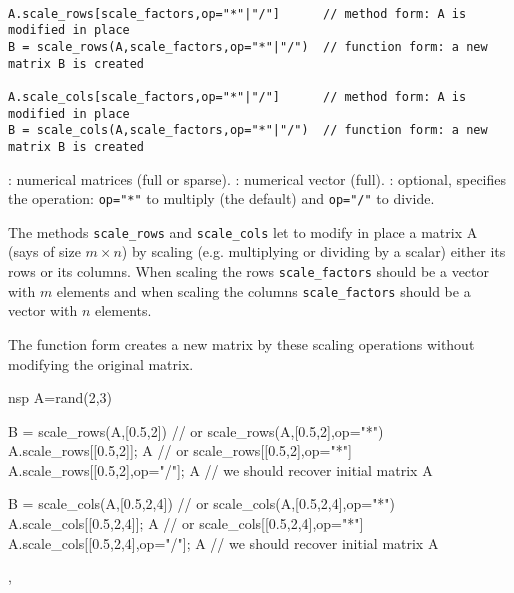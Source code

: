 \begin{mandesc}
  \\ 
\end{mandesc}
\begin{calling_sequence}
\begin{verbatim}
A.scale_rows[scale_factors,op="*"|"/"]      // method form: A is modified in place
B = scale_rows(A,scale_factors,op="*"|"/")  // function form: a new matrix B is created

A.scale_cols[scale_factors,op="*"|"/"]      // method form: A is modified in place
B = scale_cols(A,scale_factors,op="*"|"/")  // function form: a new matrix B is created
\end{verbatim}
\end{calling_sequence}
\begin{parameters}
  \begin{varlist}
    : numerical matrices (full or sparse).
    : numerical vector (full).
    : optional, specifies the operation: \verb+op="*"+ to multiply (the default)
                   and  \verb+op="/"+ to divide.
  \end{varlist}
\end{parameters}

\begin{mandescription}

The methods \verb+scale_rows+ and \verb+scale_cols+ let to modify in place a matrix A 
(says of size $m \times n$) by scaling (e.g. multiplying or dividing by a scalar) either its rows 
or its columns. When scaling the rows  \verb+scale_factors+ should be a vector with $m$ 
elements and when scaling the columns \verb+scale_factors+ should be a vector with 
$n$ elements.

The function form  creates a new matrix by these scaling operations without modifying 
the original matrix.
\end{mandescription}


\begin{examples}
\begin{mintednsp}{nsp}
A=rand(2,3)

B = scale_rows(A,[0.5,2])    // or scale_rows(A,[0.5,2],op="*") 
A.scale_rows[[0.5,2]]; A     // or scale_rows[[0.5,2],op="*"] 
A.scale_rows[[0.5,2],op="/"]; A  // we should recover initial matrix A

B = scale_cols(A,[0.5,2,4])  // or scale_cols(A,[0.5,2,4],op="*") 
A.scale_cols[[0.5,2,4]]; A   // or scale_cols[[0.5,2,4],op="*"] 
A.scale_cols[[0.5,2,4],op="/"]; A   // we should recover initial matrix A
\end{mintednsp}

\end{examples}

\begin{manseealso}
,
\end{manseealso}


